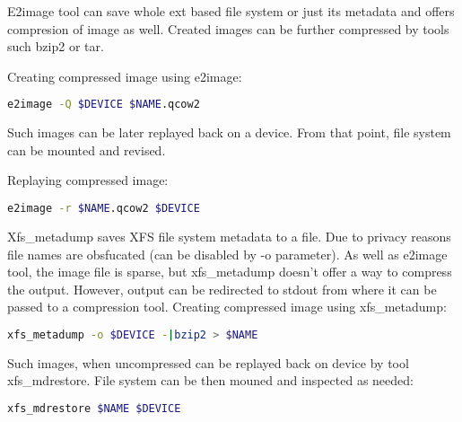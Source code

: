 \documentclass[
  color, %
  table, %
  lof,   %
  lot,   %
]{fithesis3}
\begin{document}
E2image tool can save whole ext based file system or just its metadata and offers compresion of image as well. Created images can be further compressed by tools such bzip2 or tar.

\noindent Creating compressed image using e2image:
\begin{lstlisting}[language=bash]
  e2image -Q $DEVICE $NAME.qcow2
\end{lstlisting}

\noindent Such images can be later replayed back on a device. From that point, file system can be mounted and revised.

\noindent Replaying compressed image:
\begin{lstlisting}[language=bash]
  e2image -r $NAME.qcow2 $DEVICE
\end{lstlisting}

Xfs\_metadump saves XFS file system metadata to a file. Due to privacy reasons file names are obsfucated (can be disabled by -o parameter). As well as e2image tool, the image file is sparse, but xfs\_metadump doesn't offer a way to compress the output. However, output can be redirected to stdout from where it can be passed to a compression tool. Creating compressed image using xfs\_metadump:

\begin{lstlisting}[language=bash]
  xfs_metadump -o $DEVICE -|bzip2 > $NAME
\end{lstlisting}

Such images, when uncompressed can be replayed back on device by tool xfs\_mdrestore. File system can be then mouned and inspected as needed:

\begin{lstlisting}[language=bash]
  xfs_mdrestore $NAME $DEVICE
\end{lstlisting}



\end{document}
